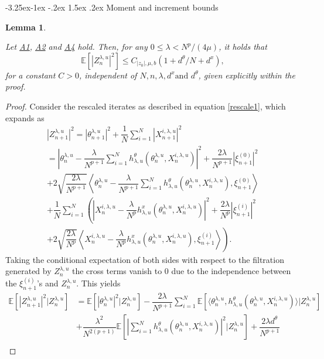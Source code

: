 \documentclass[a4paper, 10pt]{article}
\makeatletter
\theoremstyle{plain}%
\newtheorem{lemma}{Lemma}%
\renewcommand\subsubsection{\@startsection{subsubsection}{3}{\z@}%
  {-3.25ex\@plus -1ex \@minus -.2ex}%
  {1.5ex \@plus .2ex}%
  {\normalfont\small\itshape\mdseries}}
\makeatother
\begin{document}
\subsubsection{Moment and increment bounds}
\begin{lemma}\hypertarget{lemma1}{}\label{lemma1} Let \hyperlink{Assum1}{A1}, \hyperlink{Assum2}{A2} and \hyperlink{Assum4}{A4} hold. Then, for any $0\leq\lambda<N^p/(4\mu)$, it holds that
$$\mathbb{E}\left[|Z^{\lambda,u}_{n}|^2\right]\leq C_{|z_0|,\mu,b}(1+d^{\theta}/N+d^x),$$
for a constant $C>0$, independent of $N,n,\lambda, d^x \text{and } d^{\theta}$, given explicitly within the proof.\end{lemma}
\begin{proof} Consider the rescaled iterates as described in equation \eqref{rescale1}, which expands as
    \begin{gather*}
\left|Z_{n+1}^{\lambda,u}\right|^2=\left|\theta_{n+1}^{\lambda,u}\right|^2+\dfrac{1}{N}\sum_{i=1}^N \left|X_{n+1}^{i,\lambda,u}\right|^2\\ 
=\left|\theta_{n}^{\lambda,u}-\dfrac{\lambda}{N^{p+1}}\sum_{i=1}^N h^{\theta}_{\lambda,u}(\theta_{n}^{\lambda,u},X_{n}^{i,\lambda,u})\right|^2+\dfrac{2\lambda}{N^{p+1}}|\xi^{(0)}_{n+1}|^2\\
+2\sqrt{\dfrac{2\lambda}{N^{p+1}}}\left\langle \theta_{n}^{\lambda,u}-\dfrac{\lambda}{N^{p+1}}\sum_{i=1}^N h^{\theta}_{\lambda,u}(\theta_{n}^{\lambda,u},X_{n}^{i,\lambda,u}),\xi_{n+1}^{(0)}\right\rangle\\
+\dfrac{1}{N}\sum_{i=1}^N\left(\left|X_{n}^{i,\lambda,u}-\dfrac{\lambda}{N^p} h^{x}_{\lambda,u}(\theta_{n}^{\lambda,u},X_{n}^{i,\lambda,u})\right|^2+\dfrac{2\lambda}{N^p}|\xi^{(i)}_{n+1}|^2\right.\\
+\left.2\sqrt{\dfrac{2\lambda}{N^p}}\left\langle X_{n}^{i,\lambda,u}-\dfrac{\lambda}{N^p} h^{x}_{\lambda,u}(\theta_{n}^{\lambda,u},X_{n}^{i,\lambda,u}),\xi_{n+1}^{(i)}\right\rangle\right).
\end{gather*}
Taking the conditional expectation of both sides with respect to the filtration generated by $Z_{n}^{\lambda,u}$ the cross terms vanish to $0$ due to the independence between the $\xi^{(i)}_{n+1}$'s and $Z_{n}^{\lambda,u}$. This yields
\begin{align*}
\mathbb{E}\left[\left|Z_{n+1}^{\lambda,u}\right|^2|Z_{n}^{\lambda,u}\right]&=\mathbb{E}\left[\left|\theta_{n}^{\lambda,u}\right|^2|Z_{n}^{\lambda,u}\right]-\dfrac{2\lambda}{N^{p+1}}\sum_{i=1}^N\mathbb{E}\left[\langle \theta_n^{\lambda,u},h_{\lambda,u}^{\theta}(\theta_{n}^{\lambda,u},X_{n}^{i,\lambda,u})\rangle |Z_{n}^{\lambda,u}\right]\\&+\dfrac{\lambda^2}{N^{2(p+1)}}\mathbb{E}\left[\left|\sum_{i=1}^Nh_{\lambda,u}^{\theta}(\theta_{n}^{\lambda,u},X_{n}^{i,\lambda,u})\right|^2|Z_{n}^{\lambda,u}\right]+\dfrac{2\lambda d^{\theta}}{N^{p+1}}\\

\end{align*}
\end{proof}
\end{document}
